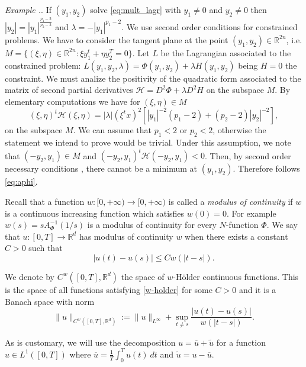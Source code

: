 \documentclass[twoside]{article}
\theoremstyle{remark}
\newcommand{\rr}{\mathbb{R}}
\renewcommand{\leq}{\leqslant}
\newcounter{example}[section]
\newenvironment{example}{\refstepcounter{example}\noindent\textit{Example \arabic{section}.\arabic{example}}.}{ }
\begin{document}
\begin{example}
If $(y_1,y_2)$ solve \eqref{eq:mult_lagr} with $y_1\neq 0$ and $y_2 \neq 0$ then  $|y_2|=|y_1|^{\frac{p_1-2}{p_2-2}}$ and $\lambda=-|y_1|^{p_1-2}$.  We use second order conditions for constrained problems.
We have to consider  the tangent plane at the point $(y_1,y_2)\in \rr^{2n}$, i.e. 
$M=\{(\xi,\eta) \in \rr^{2n}: \xi y_1^t+\eta y_2^T=0\}$. Let $L$ be the Lagrangian associated to the constrained problem: $L(y_1,y_2,\lambda)=\Phi(y_1,y_2)+\lambda H(y_1,y_2)$ being $H=0$ the constraint. We must analize the positivity of the quadratic form associated to the matrix  of second partial derivatives $\mathcal{H}=D^2 \Phi+ \lambda D^2 H$ 
on the subspace $M$. By elementary computations we have for $(\xi,\eta)\in M$
\[(\xi,\eta)^t\mathcal{H}(\xi,\eta)=
|\lambda| (\xi^tx)^2 [|y_1|^{-2}(p_1-2)+(p_2-2)|y_2|^{-2}],\]
on the subspace $M$. We can assume that $p_1<2$ or $p_2<2$, otherwise the statement we intend to prove would be trivial. Under this assumption, we note that $(-y_2,y_1)\in M$ and $(-y_2,y_1)^t\mathcal{H}(-y_2,y_1)<0$.
Then, by second order necessary conditions \cite[p.333]{luenberger2015linear}, 
 there cannot be a minimum at $(y_1,y_2)$. Therefore follows \eqref{eq:aphi}.

  
\end{example}




 Recall that a function   $w:[0,+\infty)\to [0,+\infty)$ is called  a \emph{modulus of continuity} if $w$ is a continuous increasing function which satisfies $w(0)=0$. For example $w(s)=sA_{\Phi}^{-1}(1/s)$ is a modulus of  continuity for every $N$-function $\Phi$.  We say that $u:[0,T]\to\rr^d$  has modulus of continuity $w$  when there exists a constant $C>0$ such that
\begin{equation}\label{w-holder}|u(t)-u(s)|\leq Cw(|t-s|).
\end{equation}


We denote by $C^w([0,T],\rr^d)$  the space of  $w$-H\"older continuous functions. This is the space of all functions satisfying \eqref{w-holder} for some $C>0$ and it is a Banach space with norm
\[\|u\|_{  C^w([0,T],\rr^d) }  :=\|u\|_{L^{\infty}}+\sup\limits_{t\neq s}\frac{|u(t)-u(s)|}{w(|t-s|)}.\]





 As is customary, we will use the decomposition $u=\overline{u}+\widetilde{u}$ for a function $u\in L^1([0,T])$  where $\overline{u} =\frac1T\int_0^T u(t)\ dt$ and $\widetilde{u}=u-\overline{u}$.
\end{document}
